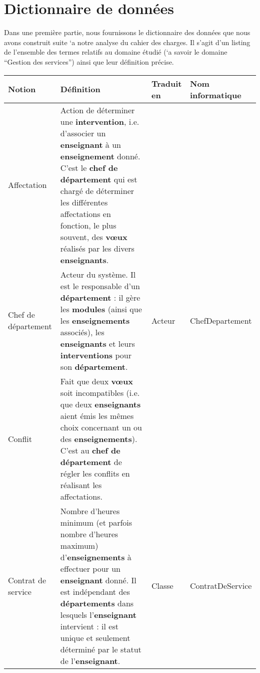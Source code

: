 
\chapter{Dictionnaire de données}

Dans une première partie, nous fournissons le dictionnaire des données que nous avons construit suite `a notre analyse du cahier des charges. Il s’agit d’un listing de l’ensemble des termes relatifs au domaine étudié (`a savoir le domaine “Gestion des services”) ainsi que leur définition précise.


\begin{longtable}{p{3cm}p{8cm}p{2cm}p{2cm}}

\toprule
\textbf{Notion} & \textbf{Définition} &\textbf{Traduit en} & \textbf{Nom informatique} \\
\midrule

Affectation & Action de déterminer une \textbf{intervention}, i.e. d'associer un \textbf{enseignant} à un \textbf{enseignement} donné. C'est le \textbf{chef de département} qui est chargé de déterminer les différentes affectations en fonction, le plus souvent, des \textbf{v\oe ux} réalisés par les divers \textbf{enseignants}. & &\\

Chef de département & Acteur du système. Il est le responsable d'un \textbf{département} : il gère les \textbf{modules} (ainsi que les \textbf{enseignements} associés), les \textbf{enseignants} et leurs \textbf{interventions} pour son \textbf{département}. & Acteur & ChefDepartement \\

Conflit & Fait que deux \textbf{v\oe ux} soit incompatibles (i.e. que deux \textbf{enseignants} aient émis les mêmes choix concernant un ou des \textbf{enseignements}). C'est au \textbf{chef de département} de régler les conflits en réalisant les affectations. & &\\

Contrat de service & Nombre d'heures minimum (et parfois nombre d'heures maximum) d'\textbf{enseignements} à effectuer pour un \textbf{enseignant} donné. Il est indépendant des \textbf{départements} dans lesquels l'\textbf{enseignant} intervient : il est unique et seulement déterminé par le statut de l'\textbf{enseignant}. & Classe & ContratDeService \\


\end{longtable}
